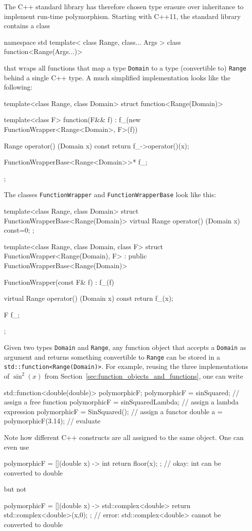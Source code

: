 \documentclass[11pt,
                 numbers=noenddot,
                 headings=normal,
                 DIV16, BCOR10mm]{scrartcl}
\newcommand{\cpp}{\lstinline}
\theoremstyle{remark}
\begin{document}
The C++ standard library has therefore chosen type erasure over inheritance to implement run-time
polymorphism.  Starting with C++11, the standard library contains a class \cite[20.8.11]{cpp_standard:2011}
\begin{c++}
namespace std
{
  template< class Range, class... Args >
  class function<Range(Args...)>
}
\end{c++}
that wraps all functions that map a type \cpp{Domain} to a type (convertible to) \cpp{Range} behind a single
C++ type.
A much simplified implementation looks like the following:
\begin{c++}
template<class Range, class Domain>
struct function<Range(Domain)>
{
  template<class F>
  function(F&& f) :
    f_(new FunctionWrapper<Range<Domain>, F>(f))
  {}

  Range operator() (Domain x) const
  {
    return f_->operator()(x);
  }

  FunctionWrapperBase<Range<Domain>>* f_;
};
\end{c++}
The classes \cpp{FunctionWrapper} and \cpp{FunctionWrapperBase} look like this:
\begin{c++}
template<class Range, class Domain>
struct FunctionWrapperBase<Range(Domain)>
{
  virtual Range operator() (Domain x) const=0;
};

template<class Range, class Domain, class F>
struct FunctionWrapper<Range(Domain), F> :
  public FunctionWrapperBase<Range(Domain)>
{
  FunctionWrapper(const F& f) : f_(f) {}

  virtual Range operator() (Domain x) const
  {
    return f_(x);
  }

  F f_;
};
\end{c++}
Given two types \cpp{Domain} and \cpp{Range}, any function object that accepts a \cpp{Domain} as argument and
returns something convertible to \cpp{Range} can be stored in a \cpp{std::function<Range(Domain)>}.  For example,
reusing the three implementations of $\sin^2(x)$ from Section~\ref{sec:function_objects_and_functions}, one can write
\begin{c++}
std::function<double(double)> polymorphicF;
polymorphicF = sinSquared;         // assign a free function
polymorphicF = sinSquaredLambda;   // assign a lambda expression
polymorphicF = SinSquared();       // assign a functor
double a = polymorphicF(3.14); // evaluate
\end{c++}
Note how different C++ constructs are all assigned to the same object.  One can even use
\begin{c++}
polymorphicF = [](double x) -> int { return floor(x); };
   // okay: int can be converted to double
\end{c++}
but not
\begin{c++}
polymorphicF = [](double x) -> std::complex<double>
   { return std::complex<double>(x,0); };
   // error: std::complex<double> cannot be converted to double
\end{c++}
\end{document}
